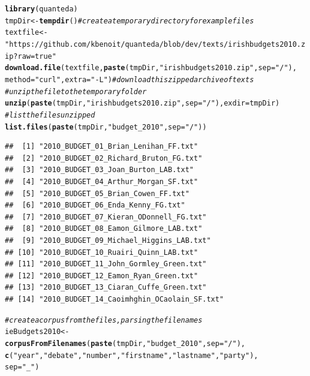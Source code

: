 \documentclass[11pt]{article}\usepackage[]{graphicx}\usepackage[]{color}
\makeatletter
\newcommand{\hlstr}[1]{\textcolor[rgb]{0.192,0.494,0.8}{#1}}%
\newcommand{\hlcom}[1]{\textcolor[rgb]{0.678,0.584,0.686}{\textit{#1}}}%
\newcommand{\hlstd}[1]{\textcolor[rgb]{0.345,0.345,0.345}{#1}}%
\newcommand{\hlkwb}[1]{\textcolor[rgb]{0.69,0.353,0.396}{#1}}%
\newcommand{\hlkwc}[1]{\textcolor[rgb]{0.333,0.667,0.333}{#1}}%
\newcommand{\hlkwd}[1]{\textcolor[rgb]{0.737,0.353,0.396}{\textbf{#1}}}%
\newenvironment{kframe}{%
 \def\at@end@of@kframe{}%
 \ifinner\ifhmode%
  \def\at@end@of@kframe{\end{minipage}}%
  \begin{minipage}{\columnwidth}%
 \fi\fi%
 \def\FrameCommand##1{\hskip\@totalleftmargin \hskip-\fboxsep
 \colorbox{shadecolor}{##1}\hskip-\fboxsep
     \hskip-\linewidth \hskip-\@totalleftmargin \hskip\columnwidth}%
 \MakeFramed {\advance\hsize-\width
   \@totalleftmargin\z@ \linewidth\hsize
   \@setminipage}}%
 {\par\unskip\endMakeFramed%
 \at@end@of@kframe}
\newenvironment{knitrout}{}{} %
\makeatother
\begin{document}
\begin{knitrout}\footnotesize
{}\color{fgcolor}\begin{kframe}
\begin{alltt}
\hlkwd{library}\hlstd{(quanteda)}
\hlstd{tmpDir} \hlkwb{<-} \hlkwd{tempdir}\hlstd{()}  \hlcom{# create a temporary directory for example files}
\hlstd{textfile} \hlkwb{<-} \hlstr{"https://github.com/kbenoit/quanteda/blob/dev/texts/irishbudgets2010.zip?raw=true"}
\hlkwd{download.file}\hlstd{(textfile,} \hlkwd{paste}\hlstd{(tmpDir,} \hlstr{"irishbudgets2010.zip"}\hlstd{,} \hlkwc{sep}\hlstd{=}\hlstr{"/"}\hlstd{),}
              \hlkwc{method}\hlstd{=}\hlstr{"curl"}\hlstd{,} \hlkwc{extra}\hlstd{=}\hlstr{"-L"}\hlstd{)} \hlcom{# download this zipped archive of texts}
\hlcom{# unzip the file to the temporary folder}
\hlkwd{unzip}\hlstd{(}\hlkwd{paste}\hlstd{(tmpDir,} \hlstr{"irishbudgets2010.zip"}\hlstd{,} \hlkwc{sep}\hlstd{=}\hlstr{"/"}\hlstd{),} \hlkwc{exdir}\hlstd{=tmpDir)}
\hlcom{# list the files unzipped}
\hlkwd{list.files}\hlstd{(}\hlkwd{paste}\hlstd{(tmpDir,} \hlstr{"budget_2010"}\hlstd{,} \hlkwc{sep}\hlstd{=}\hlstr{"/"}\hlstd{))}
\end{alltt}
\begin{verbatim}
##  [1] "2010_BUDGET_01_Brian_Lenihan_FF.txt"      
##  [2] "2010_BUDGET_02_Richard_Bruton_FG.txt"     
##  [3] "2010_BUDGET_03_Joan_Burton_LAB.txt"       
##  [4] "2010_BUDGET_04_Arthur_Morgan_SF.txt"      
##  [5] "2010_BUDGET_05_Brian_Cowen_FF.txt"        
##  [6] "2010_BUDGET_06_Enda_Kenny_FG.txt"         
##  [7] "2010_BUDGET_07_Kieran_ODonnell_FG.txt"    
##  [8] "2010_BUDGET_08_Eamon_Gilmore_LAB.txt"     
##  [9] "2010_BUDGET_09_Michael_Higgins_LAB.txt"   
## [10] "2010_BUDGET_10_Ruairi_Quinn_LAB.txt"      
## [11] "2010_BUDGET_11_John_Gormley_Green.txt"    
## [12] "2010_BUDGET_12_Eamon_Ryan_Green.txt"      
## [13] "2010_BUDGET_13_Ciaran_Cuffe_Green.txt"    
## [14] "2010_BUDGET_14_Caoimhghin_OCaolain_SF.txt"
\end{verbatim}
\begin{alltt}
\hlcom{# create a corpus from the files, parsing the filenames}
\hlstd{ieBudgets2010} \hlkwb{<-} \hlkwd{corpusFromFilenames}\hlstd{(}\hlkwd{paste}\hlstd{(tmpDir,} \hlstr{"budget_2010"}\hlstd{,} \hlkwc{sep}\hlstd{=}\hlstr{"/"}\hlstd{),}
                                     \hlkwd{c}\hlstd{(}\hlstr{"year"}\hlstd{,} \hlstr{"debate"}\hlstd{,} \hlstr{"number"}\hlstd{,} \hlstr{"firstname"}\hlstd{,} \hlstr{"lastname"}\hlstd{,} \hlstr{"party"}\hlstd{),}
                                     \hlkwc{sep}\hlstd{=}\hlstr{"_"}\hlstd{)}
\end{alltt}
\end{kframe}
\end{knitrout}
\end{document}
